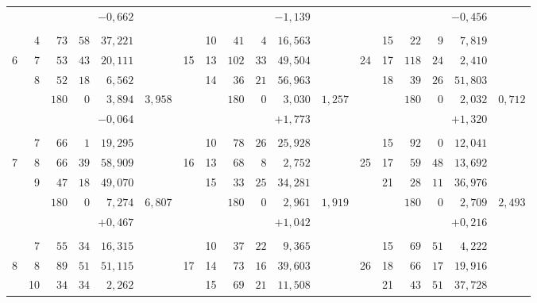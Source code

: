 \begin{center}
\begin{tabular}{|r|r|r@{\;}r@{\;}r|r||r|r|r@{\;}r@{\;}r|r||r|r|r@{\;}r@{\;}r|r|}
 &  & \multicolumn{3}{r|}{$-0{,}662$} &  &  &  & \multicolumn{3}{r|}{$-1{,}139$} &  &  &  & \multicolumn{3}{r|}{$-0{,}456$} & \\
 &  &  &  &  &  &  &  &  &  &  &  &  &  &  &  &  & \\
 & 4 & $73$ & $58$ & $37{,}221$ &  &  & 10 & $41$ & $4$ & $16{,}563$ &  &  & 15 & $22$ & $9$ & $7{,}819$ & \\
6 & 7 & $53$ & $43$ & $20{,}111$ &  & 15 & 13 & $102$ & $33$ & $49{,}504$ &  & 24 & 17 & $118$ & $24$ & $2{,}410$ & \\
 & 8 & $52$ & $18$ & $6{,}562$ &  &  & 14 & $36$ & $21$ & $56{,}963$ &  &  & 18 & $39$ & $26$ & $51{,}803$ & \\
\cline{3-5}\cline{9-11}\cline{15-17}
 &  & $180$ & $0$ & $3{,}894$ & $3{,}958$ &  &  & $180$ & $0$ & $3{,}030$ & $1{,}257$ &  &  & $180$ & $0$ & $2{,}032$ & $0{,}712$\\
 &  & \multicolumn{3}{r|}{$-0{,}064$} &  &  &  & \multicolumn{3}{r|}{$+1{,}773$} &  &  &  & \multicolumn{3}{r|}{$+1{,}320$} & \\
 &  &  &  &  &  &  &  &  &  &  &  &  &  &  &  &  & \\
 & 7 & $66$ & $1$ & $19{,}295$ &  &  & 10 & $78$ & $26$ & $25{,}928$ &  &  & 15 & $92$ & $0$ & $12{,}041$ & \\
7 & 8 & $66$ & $39$ & $58{,}909$ &  & 16 & 13 & $68$ & $8$ & $2{,}752$ &  & 25 & 17 & $59$ & $48$ & $13{,}692$ & \\
 & 9 & $47$ & $18$ & $49{,}070$ &  &  & 15 & $33$ & $25$ & $34{,}281$ &  &  & 21 & $28$ & $11$ & $36{,}976$ & \\
\cline{3-5}\cline{9-11}\cline{15-17}
 &  & $180$ & $0$ & $7{,}274$ & $6{,}807$ &  &  & $180$ & $0$ & $2{,}961$ & $1{,}919$ &  &  & $180$ & $0$ & $2{,}709$ & $2{,}493$\\
 &  & \multicolumn{3}{r|}{$+0{,}467$} &  &  &  & \multicolumn{3}{r|}{$+1{,}042$} &  &  &  & \multicolumn{3}{r|}{$+0{,}216$} & \\
 &  &  &  &  &  &  &  &  &  &  &  &  &  &  &  &  & \\
 & 7 & $55$ & $34$ & $16{,}315$ &  &  & 10 & $37$ & $22$ & $9{,}365$ &  &  & 15 & $69$ & $51$ & $4{,}222$ & \\
8 & 8 & $89$ & $51$ & $51{,}115$ &  & 17 & 14 & $73$ & $16$ & $39{,}603$ &  & 26 & 18 & $66$ & $17$ & $19{,}916$ & \\
 & 10 & $34$ & $34$ & $2{,}262$ &  &  & 15 & $69$ & $21$ & $11{,}508$ &  &  & 21 & $43$ & $51$ & $37{,}728$ & \\
\cline{3-5}\cline{9-11}\cline{15-17}

\end{tabular}
\end{center}
